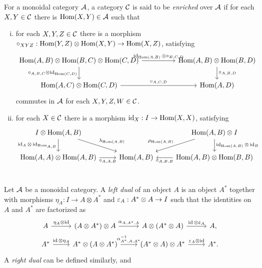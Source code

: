 \documentclass{../../large}
\begin{document}
\begin{prb}
For a monoidal category $\mathcal{A}$, a category $\mathcal{C}$ is said to be \emph{enriched} over $\mathcal{A}$ if for each $X,Y\in\mathcal{C}$ there is $\operatorname{Hom}(X,Y)\in\mathcal{A}$ such that
\begin{enumerate}[(i)]
\item for each $X,Y,Z\in\mathcal{C}$ there is a morphism $\circ_{XYZ}:\operatorname{Hom}(Y,Z)\otimes\operatorname{Hom}(X,Y)\to\operatorname{Hom}(X,Z)$, satisfying
\[\begin{tikzcd}[column sep=huge]
\Hom(A,B)\otimes\Hom(B,C)\otimes\Hom(C,D) \rar{\id_{\Hom(A,B)}\otimes\circ_{B,C,D}} \dar[swap]{\circ_{A,B,C}\otimes\id_{\Hom(C,D)}} &
\Hom(A,B)\otimes\Hom(B,D) \dar{\circ_{A,B,D}} \\
\Hom(A,C)\otimes\Hom(C,D) \rar{\circ_{A,C,D}} &
\Hom(A,D)
\end{tikzcd}\]
commutes in $\mathcal{A}$ for each $X,Y,Z,W\in\mathcal{C}$.
\item for each $X\in\mathcal{C}$ there is a morphism $\operatorname{id}_X:I\to\operatorname{Hom}(X,X)$, satisfying
\[\begin{tikzcd}
I\otimes\Hom(A,B) \dar[swap]{\id_A\otimes\id_{\Hom_{A,B}}} \ar{dr}{\lambda_{\Hom(A,B)}} &&
\Hom(A,B)\otimes I \ar[swap]{dl}{\rho_{\Hom(A,B)}} \dar{\id_{\Hom(A,B)}\otimes\id_B}\\
\Hom(A,A)\otimes\Hom(A,B) \rar[swap]{\circ_{A,A,B}} &
\Hom(A,B)  &
\Hom(A,B)\otimes\Hom(B,B) \lar{\circ_{A,B,B}}
\end{tikzcd}\]
\end{enumerate}
\end{prb}

\section{}

\begin{prb}
\end{prb}


\begin{prb}
Let $\mathcal{A}$ be a monoidal category.
A \emph{left dual} of an object $A$ is an object $A^*$ together with morphisms $\eta_A:I\to A\otimes A^*$ and $\varepsilon_A:A^*\otimes A\to I$ such that the identities on $A$ and $A^*$ are factorized as
\[\begin{tikzcd}[row sep=small]
A \rar{\eta_A\otimes\id} & (A\otimes A^*)\otimes A \rar{\alpha_{A,A^*,A}} & A\otimes(A^*\otimes A) \rar{\id\otimes\e_A} & A,\\
A^* \rar{\id\otimes\eta_A} & A^*\otimes(A\otimes A^*) \rar{\alpha_{A^*,A,A^*}^{-1}} & (A^*\otimes A)\otimes A^* \rar{\e_A\otimes\id} & A^*.
\end{tikzcd}\]
A \emph{right dual} can be defined similarly, and 
\end{prb}
\end{document}
